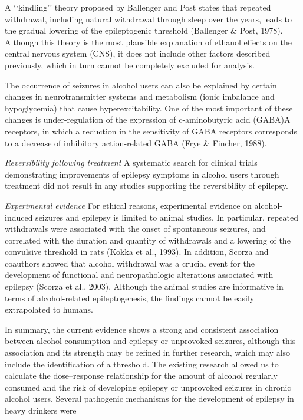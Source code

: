 \documentclass{article}
\begin{document}
A ‘‘kindling’’ theory proposed by Ballenger and Post states that repeated withdrawal, including natural withdrawal through sleep over the years, leads to the gradual lowering of the epileptogenic threshold (Ballenger \& Post, 1978). Although this theory is the most plausible explanation of ethanol effects on the central nervous system (CNS), it does not include other factors described previously, which in turn cannot be completely excluded for analysis.

The occurrence of seizures in alcohol users can also be explained by certain changes in neurotransmitter systems and metabolism (ionic imbalance and hypoglycemia) that cause hyperexcitability. One of the most important of these changes is under-regulation of the expression of c-aminobutyric acid (GABA)A receptors, in which a reduction in the sensitivity of GABA receptors corresponds to a decrease of inhibitory action-related GABA (Frye \& Fincher, 1988).

\textit{Reversibility following treatment}
A systematic search for clinical trials demonstrating
improvements of epilepsy symptoms in alcohol users
through treatment did not result in any studies supporting
the reversibility of epilepsy.

\textit{Experimental evidence}
For ethical reasons, experimental evidence on alcohol-induced seizures and epilepsy is limited to animal studies.
In particular, repeated withdrawals were associated with the
onset of spontaneous seizures, and correlated with the duration and quantity of withdrawals and a lowering of the convulsive threshold in rats (Kokka et al., 1993). In addition,
Scorza and coauthors showed that alcohol withdrawal was a
crucial event for the development of functional and neuropathologic alterations associated with epilepsy (Scorza
et al., 2003). Although the animal studies are informative in
terms of alcohol-related epileptogenesis, the findings cannot
be easily extrapolated to humans.

In summary, the current evidence shows a strong and consistent association between alcohol consumption and epilepsy or unprovoked seizures, although this association and
its strength may be refined in further research, which may
also include the identification of a threshold. The existing
research allowed us to calculate the dose–response relationship for the amount of alcohol regularly consumed and the
risk of developing epilepsy or unprovoked seizures in
chronic alcohol users. Several pathogenic mechanisms for
the development of epilepsy in heavy drinkers were
\end{document}
